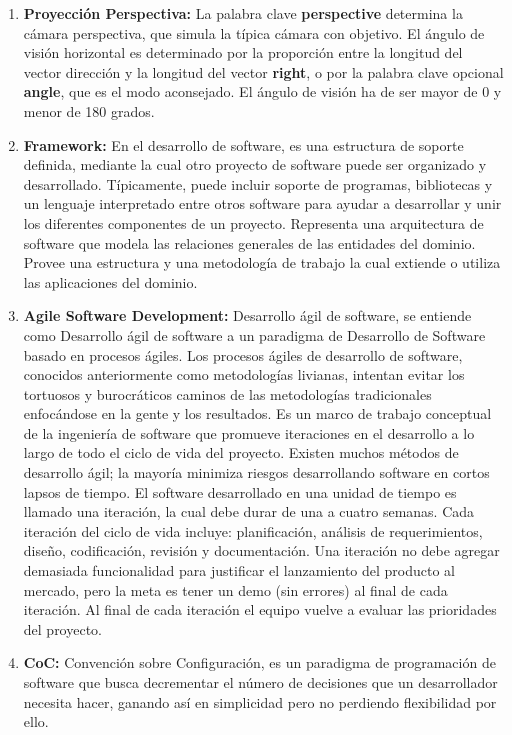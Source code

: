 \begin{enumerate}
\item \textbf{Proyección Perspectiva:} La palabra clave \textbf{perspective} determina la cámara perspectiva, que simula la típica cámara con objetivo. El ángulo de visión horizontal es determinado por la proporción entre la longitud del vector dirección y la longitud del vector \textbf{right}, o por la palabra clave opcional \textbf{angle}, que es el modo aconsejado. El ángulo de visión ha de ser mayor de 0 y menor de 180 grados.
\item \textbf{Framework:} En el desarrollo de software, es una estructura de soporte definida, mediante la cual otro proyecto de software puede ser organizado y desarrollado. Típicamente, puede incluir soporte de programas, bibliotecas y un lenguaje interpretado entre otros software para ayudar a desarrollar y unir los diferentes componentes de un proyecto.
Representa una arquitectura de software que modela las relaciones generales de las entidades del dominio. Provee una estructura y una metodología de trabajo la cual extiende o utiliza las aplicaciones del dominio.
\item \textbf{Agile Software Development:} Desarrollo ágil de software, se entiende como Desarrollo ágil de software a un paradigma de Desarrollo de Software basado en procesos ágiles. Los procesos ágiles de desarrollo de software, conocidos anteriormente como metodologías livianas, intentan evitar los tortuosos y burocráticos caminos de las metodologías tradicionales enfocándose en la gente y los resultados.
Es un marco de trabajo conceptual de la ingeniería de software que promueve iteraciones en el desarrollo a lo largo de todo el ciclo de vida del proyecto. Existen muchos métodos de desarrollo ágil; la mayoría minimiza riesgos desarrollando software en cortos lapsos de tiempo. El software desarrollado en una unidad de tiempo es llamado una iteración, la cual debe durar de una a cuatro semanas. Cada iteración del ciclo de vida incluye: planificación, análisis de requerimientos, diseño, codificación, revisión y documentación. Una iteración no debe agregar demasiada funcionalidad para justificar el lanzamiento del producto al mercado, pero la meta es tener un demo (sin errores) al final de cada iteración. Al final de cada iteración el equipo vuelve a evaluar las prioridades del proyecto.
\item \textbf{CoC:} Convención sobre Configuración, es un paradigma de programación de software que busca decrementar el número de decisiones que un desarrollador necesita hacer, ganando así en simplicidad pero no perdiendo flexibilidad por ello.

\end{enumerate}
